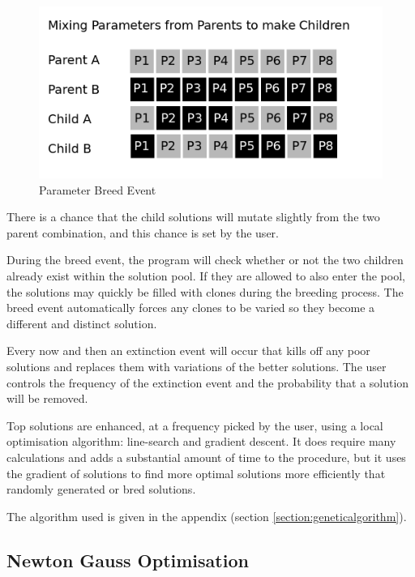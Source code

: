 \begin{figure}[h]
  \begin{center}
    \includegraphics[scale=0.30]{chapters/potentials_fe_pd_ru/images/breeding.png}
    \caption{Parameter Breed Event}
    \label{fig:gabreedevent}
  \end{center}
\end{figure}

There is a chance that the child solutions will mutate slightly from the two parent combination, and this chance is set by the user.

During the breed event, the program will check whether or not the two children already exist within the solution pool.  If they are allowed to also enter the pool, the solutions may quickly be filled with clones during the breeding process.  The breed event automatically forces any clones to be varied so they become a different and distinct solution.

Every now and then an extinction event will occur that kills off any poor solutions and replaces them with variations of the better solutions.  The user controls the frequency of the extinction event and the probability that a solution will be removed.

Top solutions are enhanced, at a frequency picked by the user, using a local optimisation algorithm: line-search and gradient descent.  It does require many calculations and adds a substantial amount of time to the procedure, but it uses the gradient of solutions to find more optimal solutions more efficiently that randomly generated or bred solutions.

The algorithm used is given in the appendix (section \ref{section:geneticalgorithm}).


\subsection{Newton Gauss Optimisation}

